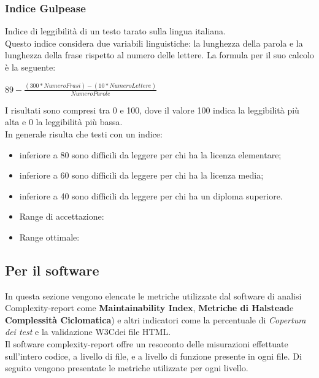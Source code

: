 \documentclass[a4paper,11pt]{article}
\begin{document}
\subsubsection{Indice Gulpease} Indice di leggibilità di un testo tarato sulla lingua italiana. \\
Questo indice considera due variabili linguistiche: la lunghezza della parola e la lunghezza della frase rispetto al numero delle lettere.
La formula per il suo calcolo è la seguente:\\
\begin{center}
\begin{math}
89 - \frac{(300 * NumeroFrasi) - (10 * NumeroLettere)}{NumeroParole}
\end{math}
\end{center}
I risultati sono compresi tra 0 e 100, dove il valore 100 indica la leggibilità più alta e 0 la leggibilità più bassa.\\
In generale risulta che testi con un indice:
\begin{itemize}
\item inferiore a 80 sono difficili da leggere per chi ha la licenza elementare;
\item inferiore a 60 sono difficili da leggere per chi ha la licenza media;
\item inferiore a 40 sono difficili da leggere per chi ha un diploma superiore.
\end{itemize}
\begin{itemize}
\item Range di accettazione: \begin{math}[50 - 100]\end{math}
\item Range ottimale: \begin{math}[60 - 100]\end{math}
\end{itemize}
\subsection{Per il software}

In questa sezione vengono elencate le metriche utilizzate dal software di analisi Complexity-report come \textbf{Maintainability Index}\addglos, \textbf{Metriche di Halstead}\addglos e \textbf{Complessità Ciclomatica}\addglos) e altri indicatori come la percentuale di \textit{Copertura dei test} e la validazione W3C\addglos dei file HTML\addglos.  
\\
Il software complexity-report offre un resoconto delle misurazioni effettuate sull'intero codice, a livello di file, e a livello di funzione presente in ogni file. 
Di seguito vengono presentate le metriche utilizzate per ogni livello.
\end{document}
